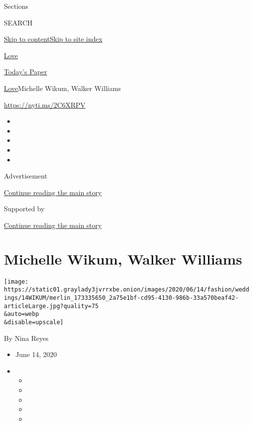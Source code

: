 Sections

SEARCH

\protect\hyperlink{site-content}{Skip to
content}\protect\hyperlink{site-index}{Skip to site index}

\href{https://www.nytimes3xbfgragh.onion/section/fashion/weddings}{Love}

\href{https://myaccount.nytimes3xbfgragh.onion/auth/login?response_type=cookie\&client_id=vi}{}

\href{https://www.nytimes3xbfgragh.onion/section/todayspaper}{Today's
Paper}

\href{/section/fashion/weddings}{Love}\textbar{}Michelle Wikum, Walker
Williams

\href{https://nyti.ms/2C6XRPV}{https://nyti.ms/2C6XRPV}

\begin{itemize}
\item
\item
\item
\item
\item
\end{itemize}

Advertisement

\protect\hyperlink{after-top}{Continue reading the main story}

Supported by

\protect\hyperlink{after-sponsor}{Continue reading the main story}

\hypertarget{michelle-wikum-walker-williams}{%
\section{Michelle Wikum, Walker
Williams}\label{michelle-wikum-walker-williams}}

\texttt{[image: https://static01.graylady3jvrrxbe.onion/images/2020/06/14/fashion/weddings/14WIKUM/merlin\_173335650\_2a75e1bf-cd95-4130-986b-33a570beaf42-articleLarge.jpg?quality=75\\\&auto=webp\\\&disable=upscale]}

By Nina Reyes

\begin{itemize}
\item
  June 14, 2020
\item
  \begin{itemize}
  \item
  \item
  \item
  \item
  \item
  \end{itemize}
\end{itemize}

